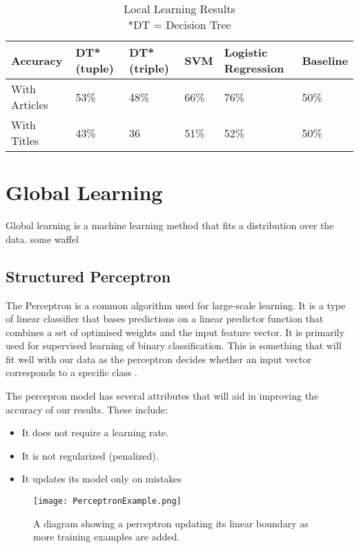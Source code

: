 \documentclass[bsc,frontabs,twoside,singlespacing,parskip,deptreport]{infthesis}     %
\begin{document}
\begin{table}[H]
\centering
\label{table:local-learning}
\begin{tabular}{|p{5em}|l|l|l|p{4em}|l|}
  \hline
  Accuracy  & DT* (tuple) & DT* (triple) & SVM & Logistic Regression & Baseline\\
  \hline
  With Articles    & 53\%  & 48\%    & 66\% &  76\% & 50\%\\
\hline
With Titles & 43\%  & 36& 51\%    & 52\% & 50\%\\
\hline
\end{tabular}
\caption{Local Learning Results  \\*DT = Decision Tree }
\end{table}


\section{Global Learning}
Global learning is a machine learning method that fits a distribution over the data.
some waffel \cite{huang2008machine}

\subsection{Structured Perceptron}
The Perceptron is a common algorithm used for large-scale learning.
It is a type of linear classifier that bases predictions on a linear predictor function that combines a set of optimised weights
and the input feature vector.
It is primarily used for supervised learning of binary classification.
This is something that will fit well with our data as the perceptron decides whether an input vector
corresponds to a specific class \cite{freund1999large}.

The percepron model has several attributes that will aid in improving the accuracy of our results.
These include:
\begin{itemize}
\item It does not require a learning rate.
\item It is not regularized (penalized).
\item It updates its model only on mistakes
\end{itemize}

\begin{figure}[H]
  \centering
  \texttt{[image: PerceptronExample.png]}
  \caption{A diagram showing a perceptron updating its linear boundary as more training examples are added. }
\end{figure}
\end{document}
